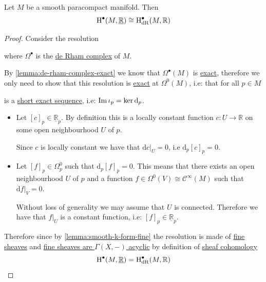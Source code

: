 \documentclass[../../main]{subfiles}
\begin{document}
\begin{theorem}
  Let \(M\) be a smooth paracompact manifold.
  Then
  \begin{equation*}
     \operatorname{H}^{\bullet}(M, \underline{\mathbb{R}}) \cong \operatorname{H}^{\bullet}_{\operatorname{dR}}(M, \mathbb{R})
  \end{equation*}
\end{theorem}
\begin{proof}
  Consider the resolution
  \begin{center}
  \end{center}
  where \(\Omega^{\bullet}\) is the \hyperref[def:de-rham-complex]{de Rham complex} of \(M\).

  By \autoref{lemma:de-rham-complex-exact} we know that \(\Omega^{\bullet}(M)\) is \hyperref[def:exact-complex]{exact}, therefore we only need to show that this resolution is \hyperref[def:exact-complex]{exact} at \(\Omega^{0}(M)\), i.e: that for all \(p \in M\)
  \begin{center}
  \end{center}
  is a \hyperref[def:short-exact-sequence]{short exact sequence}, i.e: \(\operatorname*{Im} \iota_{p} = \ker \mathrm{d}_{p}\).

  \begin{itemize}
    \item[\(\subseteq\)] Let \([c]_{p} \in \underline{\mathbb{R}}_{p}\). By definition this is a locally constant function \(c: U \to \mathbb{R}\) on some open neighbourhood \(U\) of \(p\).

          Since \(c\) is locally constant we have that \(\mathrm{d}c|_{U} = 0\), i.e \(\mathrm{d}_{p}[c]_{p} = 0\).
    \item[\(\supseteq\)] Let \([f]_{p} \in \Omega_{p}^{0}\) such that \(\mathrm{d}_{p}[f]_{p} = 0\).
          This means that there exists an open neighbourhood \(U\) of \(p\) and a function \(f \in \Omega^{0}(V) \cong \mathcal{C}^{\infty}(M)\) such that \(\mathrm{d}f|_{V} = 0\).

          Without loss of generality we may assume that \(U\) is connected.
          Therefore we have that \(f|_{U}\) is a constant function, i.e: \([f]_{p} \in \underline{\mathbb{R}}_{p}\).
  \end{itemize}

  Therefore since by \autoref{lemma:smooth-k-form-fine} the resolution is made of \hyperref[def:fine-sheaf]{fine sheaves} and \hyperref[prop:fine-are-acyclic]{fine sheaves are \(\Gamma(X, -)\) acyclic} by definition of \hyperref[def:sheaf-cohomology]{sheaf cohomology}
  \begin{equation*}
      \operatorname{H}^{\bullet}(M, \underline{\mathbb{R}}) = \operatorname{H}^{\bullet}_{\operatorname{dR}}(M, \mathbb{R})
  \end{equation*}
\end{proof}
\end{document}
